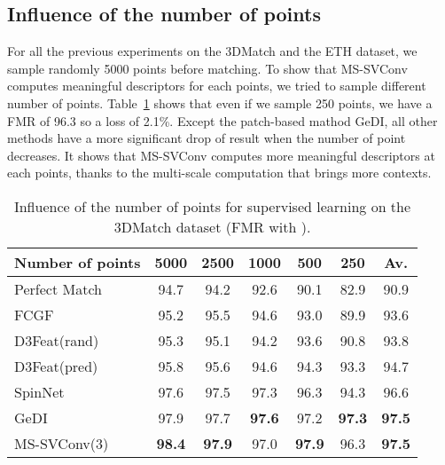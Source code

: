 \documentclass[10pt,twocolumn,letterpaper]{article}
\begin{document}
\subsection{Influence of the number of points}
For all the previous experiments on the 3DMatch and the ETH dataset, we sample randomly 5000 points before matching. To show that MS-SVConv computes meaningful descriptors for each points, we tried to sample different number of points. Table~\ref{tab:num_pt_3dm} shows that even if we sample 250 points, we have a FMR of 96.3 so a loss of 2.1\%. Except the patch-based mathod GeDI, all other methods have a more significant drop of result when the number of point decreases. It shows that MS-SVConv computes more meaningful descriptors at each points, thanks to the multi-scale computation that brings more contexts.
\begin{table}[ht]
\scriptsize
\centering
\begin{tabular}[t]{lcccccc}
\toprule
Number of points & 5000 & 2500 & 1000 & 500 & 250 & Av.\\
\midrule
Perfect Match~\cite{gojcic2018perfect} & 94.7 &94.2 &92.6 &90.1 &82.9 &90.9 \\
FCGF~\cite{choy2019fully} & 95.2& 95.5 & 94.6 & 93.0 & 89.9 & 93.6 \\
D3Feat(rand)~\cite{bai2020d3feat} & 95.3 &95.1 &94.2& 93.6& 90.8& 93.8 \\
D3Feat(pred)~\cite{bai2020d3feat} & 95.8 & 95.6& 94.6& 94.3& 93.3& 94.7 \\
SpinNet~\cite{ao2020SpinNet} & 97.6 &97.5& 97.3& 96.3& 94.3& 96.6 \\
GeDI~\cite{Poiesi2021gedi} & 97.9 & 97.7& \bf{97.6}& 97.2& \bf{97.3}& \bf{97.5} \\
\midrule
MS-SVConv(3) & \bf{98.4} & \bf{97.9} & 97.0 & \bf{97.9} & 96.3 & \bf{97.5} \\
\bottomrule
\end{tabular}
\caption{Influence of the number of points for supervised learning on the 3DMatch dataset (FMR with ).}
\label{tab:num_pt_3dm}
\end{table}
\end{document}
